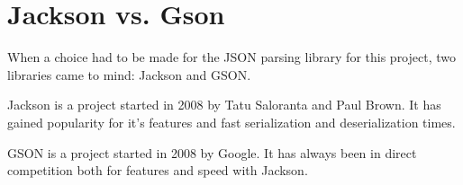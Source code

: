 
\section{Jackson vs. Gson}

When a choice had to be made for the JSON parsing library for this project, two
libraries came to mind: Jackson and GSON.\newline

Jackson is a project started in 2008 by Tatu Saloranta and Paul Brown. It has
gained popularity for it's features and fast serialization and deserialization
times.\newline

GSON is a project started in 2008 by Google. It has always been in direct
competition both for features and speed with Jackson.\newline

